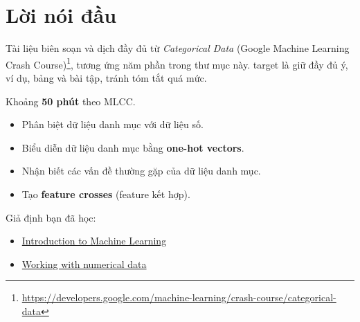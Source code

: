 \documentclass[12pt,a4paper]{article}
\begin{document}

\newpage\tableofcontents\newpage

\section*{Lời nói đầu}

\begin{ynghia}[title={Nguồn và cách đọc}]
Tài liệu biên soạn và dịch đầy đủ từ \emph{Categorical Data} (Google Machine Learning Crash Course)\footnote{\url{https://developers.google.com/machine-learning/crash-course/categorical-data}}, tương ứng năm phần trong thư mục này. target là giữ đầy đủ ý, ví dụ, bảng và bài tập, tránh tóm tắt quá mức.
\end{ynghia}

\begin{luuy}[title={Thời lượng ước tính}]
Khoảng \textbf{50 phút} theo MLCC.
\end{luuy}

\begin{phuongphap}[title={target học tập}]
\begin{itemize}
  \item Phân biệt dữ liệu danh mục với dữ liệu số.
  \item Biểu diễn dữ liệu danh mục bằng \textbf{one-hot vectors}.
  \item Nhận biết các vấn đề thường gặp của dữ liệu danh mục.
  \item Tạo \textbf{feature crosses} (feature kết hợp).
\end{itemize}
\end{phuongphap}

\begin{luuy}[title={Điều kiện tiên quyết}]
Giả định bạn đã học:
\begin{itemize}
  \item \href{https://developers.google.com/machine-learning/intro-to-ml}{Introduction to Machine Learning}
  \item \href{https://developers.google.com/machine-learning/crash-course/numerical-data}{Working with numerical data}
\end{itemize}
\end{luuy}

\newpage

\end{document}
